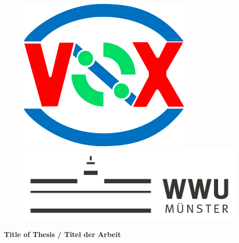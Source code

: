 \begin{centering}
\begin{figure}[!tbp]
  \centering
  \begin{minipage}[b]{0.15\textwidth}
    \includegraphics[width=\textwidth]{./figures/visix-logo.pdf}
  \end{minipage}
  \hfill
  \begin{minipage}[b]{0.5\textwidth}
    \includegraphics[width=\textwidth]{./figures/wwu-logo-neu.pdf}
  \end{minipage}
  \hfill
\end{figure}

\vspace*{\fill}

{\LARGE
	\textbf{Title of Thesis / Titel der Arbeit}\\[1cm]
}


\end{centering}
